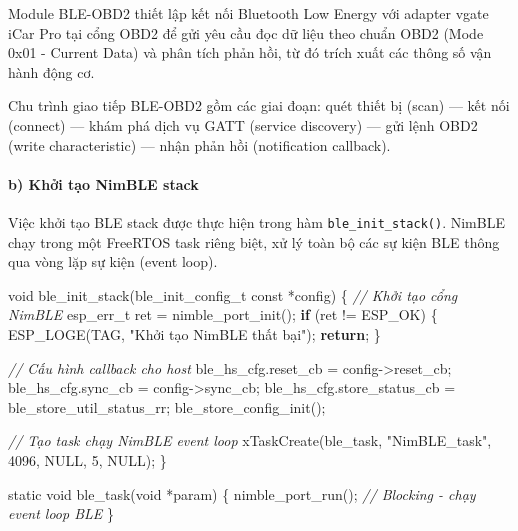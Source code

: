 \documentclass[a4paper]{extarticle}
\newenvironment{Shaded}{}{}
\newcommand{\CommentTok}[1]{\textcolor[rgb]{0.38,0.63,0.69}{\textit{#1}}}
\newcommand{\ControlFlowTok}[1]{\textcolor[rgb]{0.00,0.44,0.13}{\textbf{#1}}}
\newcommand{\DataTypeTok}[1]{\textcolor[rgb]{0.56,0.13,0.00}{#1}}
\newcommand{\DecValTok}[1]{\textcolor[rgb]{0.25,0.63,0.44}{#1}}
\newcommand{\NormalTok}[1]{#1}
\newcommand{\OperatorTok}[1]{\textcolor[rgb]{0.40,0.40,0.40}{#1}}
\newcommand{\StringTok}[1]{\textcolor[rgb]{0.25,0.44,0.63}{#1}}
\begin{document}
Module BLE-OBD2 thiết lập kết nối Bluetooth Low Energy với adapter vgate
iCar Pro tại cổng OBD2 để gửi yêu cầu đọc dữ liệu theo chuẩn OBD2 (Mode
0x01 - Current Data) và phân tích phản hồi, từ đó trích xuất các thông
số vận hành động cơ.

Chu trình giao tiếp BLE-OBD2 gồm các giai đoạn: quét thiết bị (scan) ---
kết nối (connect) --- khám phá dịch vụ GATT (service discovery) --- gửi
lệnh OBD2 (write characteristic) --- nhận phản hồi (notification
callback).

\paragraph{b) Khởi tạo NimBLE
stack}\label{b-khux1edfi-tux1ea1o-nimble-stack}

Việc khởi tạo BLE stack được thực hiện trong hàm
\texttt{ble\_init\_stack()}. NimBLE chạy trong một FreeRTOS task riêng
biệt, xử lý toàn bộ các sự kiện BLE thông qua vòng lặp sự kiện (event
loop).

\begin{Shaded}
\begin{Highlighting}[]
\DataTypeTok{void}\NormalTok{ ble\_init\_stack}\OperatorTok{(}\NormalTok{ble\_init\_config\_t }\DataTypeTok{const} \OperatorTok{*}\NormalTok{config}\OperatorTok{)}
\OperatorTok{\{}
    \CommentTok{// Khởi tạo cổng NimBLE}
\NormalTok{    esp\_err\_t ret }\OperatorTok{=}\NormalTok{ nimble\_port\_init}\OperatorTok{();}
    \ControlFlowTok{if} \OperatorTok{(}\NormalTok{ret }\OperatorTok{!=}\NormalTok{ ESP\_OK}\OperatorTok{)} \OperatorTok{\{}
\NormalTok{        ESP\_LOGE}\OperatorTok{(}\NormalTok{TAG}\OperatorTok{,} \StringTok{"Khởi tạo NimBLE thất bại"}\OperatorTok{);}
        \ControlFlowTok{return}\OperatorTok{;}
    \OperatorTok{\}}

    \CommentTok{// Cấu hình callback cho host}
\NormalTok{    ble\_hs\_cfg}\OperatorTok{.}\NormalTok{reset\_cb        }\OperatorTok{=}\NormalTok{ config}\OperatorTok{{-}\textgreater{}}\NormalTok{reset\_cb}\OperatorTok{;}
\NormalTok{    ble\_hs\_cfg}\OperatorTok{.}\NormalTok{sync\_cb         }\OperatorTok{=}\NormalTok{ config}\OperatorTok{{-}\textgreater{}}\NormalTok{sync\_cb}\OperatorTok{;}
\NormalTok{    ble\_hs\_cfg}\OperatorTok{.}\NormalTok{store\_status\_cb }\OperatorTok{=}\NormalTok{ ble\_store\_util\_status\_rr}\OperatorTok{;}
\NormalTok{    ble\_store\_config\_init}\OperatorTok{();}

    \CommentTok{// Tạo task chạy NimBLE event loop}
\NormalTok{    xTaskCreate}\OperatorTok{(}\NormalTok{ble\_task}\OperatorTok{,} \StringTok{"NimBLE\_task"}\OperatorTok{,} \DecValTok{4096}\OperatorTok{,}\NormalTok{ NULL}\OperatorTok{,} \DecValTok{5}\OperatorTok{,}\NormalTok{ NULL}\OperatorTok{);}
\OperatorTok{\}}

\DataTypeTok{static} \DataTypeTok{void}\NormalTok{ ble\_task}\OperatorTok{(}\DataTypeTok{void} \OperatorTok{*}\NormalTok{param}\OperatorTok{)}
\OperatorTok{\{}
\NormalTok{    nimble\_port\_run}\OperatorTok{();}  \CommentTok{// Blocking {-} chạy event loop BLE}
\OperatorTok{\}}
\end{Highlighting}
\end{Shaded}
\end{document}
